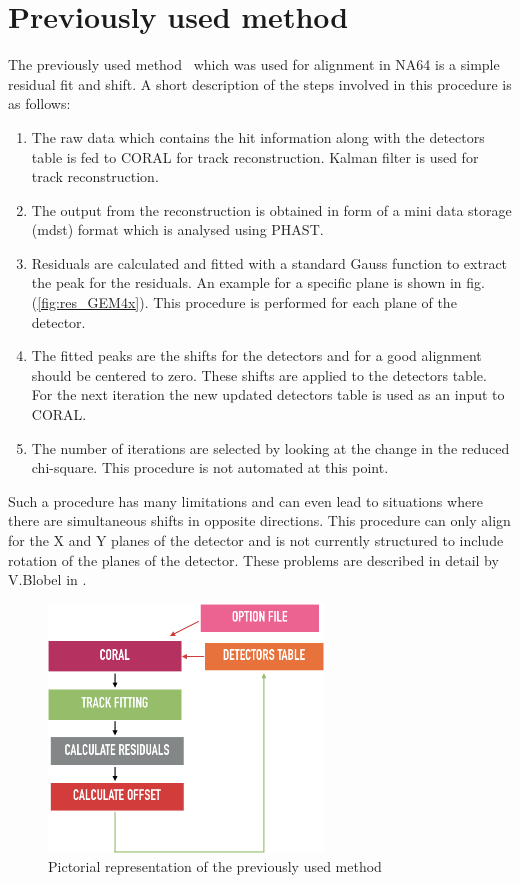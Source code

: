 \section{Previously used method}
\label{sec:prev_used}
The previously used method~\cite{nabeel:2018} which was used for alignment in NA64 is a simple residual fit and shift. A short description of the steps involved in this procedure is as follows:
\begin{enumerate}
    \item The raw data which contains the hit information along with the detectors table is fed to CORAL for track reconstruction. Kalman filter is used for track reconstruction.
    \item The output from the reconstruction is obtained in form of a mini data storage (mdst) format which is analysed using PHAST.
    \item Residuals are calculated and fitted with a standard Gauss function to extract the peak for the residuals. An example for a specific plane is shown in fig.(\ref{fig:res_GEM4x}). This procedure is performed for each plane of the detector.
    \item The fitted peaks are the shifts for the detectors and for a good alignment should be centered to zero. These shifts are applied to the detectors table. For the next iteration the new updated detectors table is used as an input to CORAL.
    \item The number of iterations are selected by looking at the change in the reduced chi-square. This procedure is not automated at this point.
\end{enumerate}
Such a procedure has many limitations and can even lead to situations where there are simultaneous shifts in opposite directions. This procedure can only align for the X and Y planes of the detector and is not currently structured to include rotation of the planes of the detector. These problems are described in detail by V.Blobel in \cite{Blobel:2006yh}.

\begin{figure}[t!]
\centering
\includegraphics[width=0.65\textwidth]{thesis_figures/Previous_method.png}
\caption{Pictorial representation of the previously used method}
\label{fig:previously_used_flowchart}
\end{figure}

